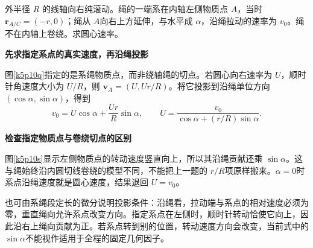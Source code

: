 \begin{question}\begin{example}[拉绳系在线轴的指定点]\label{k5p10}
外半径 $R$ 的线轴向右纯滚动。绳的一端系在内轴左侧物质点 $A$，当时 $\bm r_{A/C}=(-r,0)$；绳从 $A$向右上方延伸，与水平成 $\alpha$，沿绳拉动的速率为 $v_0$。绳不在内轴上卷绕。求圆心速率。\end{example}
\end{question}
\begin{solution}\textbf{先求指定系点的真实速度，再沿绳投影}\par\nobreak
图\ref{k5p10q}指定的是系绳物质点，而非绕轴绳的切点。若圆心向右速率为 $U$，顺时针角速度大小为 $U/R$，则 $\bm v_A=(U,Ur/R)$。将它投影到沿绳单位方向 $(\cos\alpha,\sin\alpha)$，得到
\[v_0=U\cos\alpha+\frac{Ur}{R}\sin\alpha,\qquad\boxed{U=\frac{v_0}{\cos\alpha+(r/R)\sin\alpha}}.\]



\par\medskip{}\noindent\textbf{检查指定物质点与卷绕切点的区别}\par\nobreak
图\ref{k5p10s}显示左侧物质点的转动速度竖直向上，所以其沿绳贡献还乘 $\sin\alpha$。这与绳始终沿内圆切线卷绕的模型不同，不能把上一题的 $r/R$项原样搬来。$\alpha=0$时系点沿绳速度就是圆心速度，结果退回 $U=v_0$。

也可由系绳段定长的微分说明投影条件：沿绳看，拉动端与系点的相对速度必须为零，垂直绳向允许系点改变方向。指定系点在左侧时，顺时针转动恰使它向上，因此沿右上绳向贡献为正。若系点转到别的位置，转动速度方向会改变，当前式中的 $\sin\alpha$不能视作适用于全程的固定几何因子。\end{solution}

